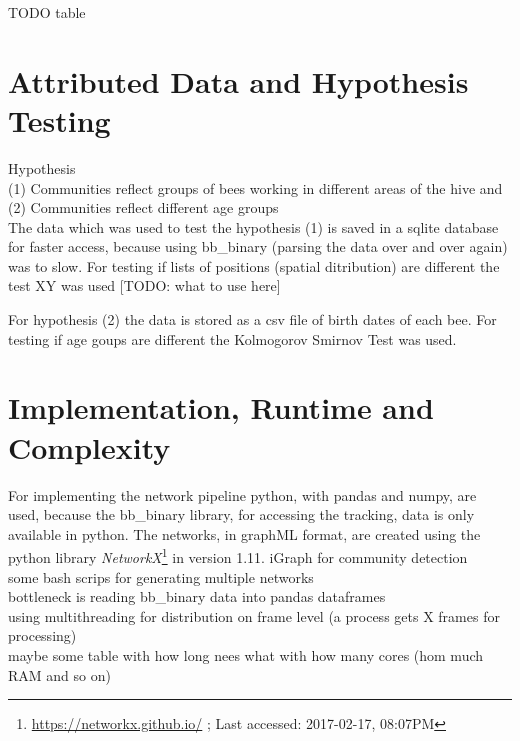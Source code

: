TODO table\\


\section{Attributed Data and Hypothesis Testing}
Hypothesis\\
(1) Communities reflect groups of bees working in different areas of the hive and\\
(2) Communities reflect different age groups\\

The data which was used to test the hypothesis (1) is saved in a sqlite database for faster access, because using bb\_binary (parsing the data over and over again) was to slow. For testing if lists of positions (spatial ditribution) are different the test XY was used [TODO: what to use here]

For hypothesis (2) the data is stored as a csv file of birth dates of each bee. For testing if age goups are different the Kolmogorov Smirnov Test was used.

\section{Implementation, Runtime and Complexity}
For implementing the network pipeline python, with pandas and numpy, are used, because the bb\_binary library, for accessing the tracking, data is only available in python. The networks, in graphML format, are created using the python library \emph{NetworkX}\footnote{\url{https://networkx.github.io/} ; Last accessed: 2017-02-17, 08:07PM} in version 1.11.
iGraph for community detection\\
some bash scrips for generating multiple networks\\

bottleneck is reading bb\_binary data into pandas dataframes\\
using multithreading for distribution on frame level (a process gets X frames for processing)\\

maybe some table with how long nees what with how many cores (hom much RAM and so on)\\